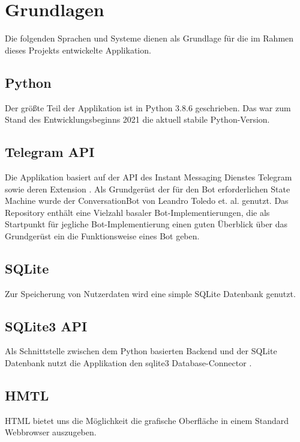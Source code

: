 \chapter{Grundlagen}

Die folgenden Sprachen und Systeme dienen als Grundlage für die im Rahmen dieses Projekts entwickelte Applikation.


\section{Python}

Der größte Teil der Applikation ist in Python 3.8.6 \cite{python3.8.6} geschrieben. Das war zum Stand des Entwicklungsbeginns 2021 die aktuell stabile Python-Version.


\section{Telegram API}

Die Applikation basiert auf der API des Instant Messaging Dienstes Telegram \cite{telegramAPI} sowie deren Extension \cite{telegramAPIext}.
Als Grundgerüst der für den Bot erforderlichen State Machine wurde der ConversationBot von Leandro Toledo et. al. genutzt. \cite{conversationBot} Das Repository enthält eine Vielzahl basaler Bot-Implementierungen, die als Startpunkt für jegliche Bot-Implementierung einen guten Überblick über das Grundgerüst ein die Funktionsweise eines Bot geben.


\section{SQLite}

Zur Speicherung von Nutzerdaten wird eine simple SQLite Datenbank \cite{sqlite} genutzt.


\section{SQLite3 API}

Als Schnittstelle zwischen dem Python basierten Backend und der SQLite Datenbank nutzt die Applikation den sqlite3 Database-Connector \cite{sqlite3API}.


\section{HMTL}

HTML bietet uns die Möglichkeit die grafische Oberfläche in einem Standard Webbrowser auszugeben. \cite{HTML}


